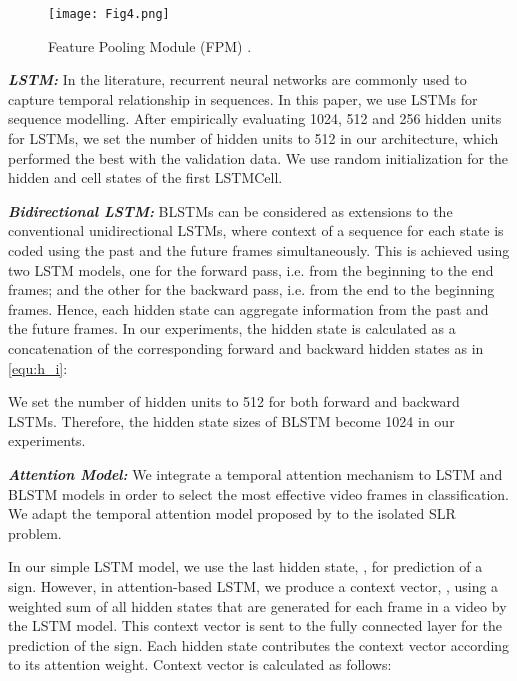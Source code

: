 \documentclass[11pt, a4paper, singlecolumn]{article}
\begin{document}
\begin{figure}
	\centering
	\texttt{[image: Fig4.png]}
	\caption{Feature Pooling Module (FPM) \cite{sincan2019isolated}.}
	\label{fig4}
\end{figure}

\textit{\textbf{LSTM: }} In the literature, recurrent neural networks are commonly used to capture temporal relationship in sequences. In this paper, we use LSTMs \cite{hochreiter1997long} for sequence modelling. After empirically evaluating 1024, 512 and 256 hidden units for LSTMs, we set the number of hidden units to 512 in our architecture, which performed the best with the validation data.  We use random initialization for the hidden and cell states of the first LSTMCell.

\textit{\textbf{Bidirectional LSTM: }} BLSTMs \cite{graves2005framewise} can be considered as extensions to the conventional unidirectional LSTMs, where context of a sequence for each state is coded using the past and the future frames simultaneously. This is achieved using two LSTM models, one for the forward pass, i.e. from the beginning to the end frames; and the other for the backward pass, i.e. from the end to the beginning frames. Hence, each hidden state can aggregate information from the past and the future frames. In our experiments, the  hidden state is calculated as a concatenation of the corresponding forward and backward hidden states as in \eqref{equ:h_i}:



We set the number of hidden units to 512 for both forward and backward LSTMs. Therefore, the hidden state sizes of BLSTM become 1024 in our experiments.

\textit{\textbf{Attention Model: }} We integrate a temporal attention mechanism to LSTM and BLSTM models in order to select the most effective video frames in classification. We adapt the temporal attention model proposed by \cite{bahdanau2014neural, raffel2015feed}  to the isolated SLR problem.

In our simple LSTM model, we use the last hidden state, , for prediction of a sign. However, in attention-based LSTM, we produce a context vector, , using a weighted sum of all hidden states that are generated for each frame in a video by the LSTM model. This context vector is sent to the fully connected layer for the prediction of the sign. Each hidden state contributes the context vector according to its attention weight. Context vector is calculated as follows:
\end{document}
